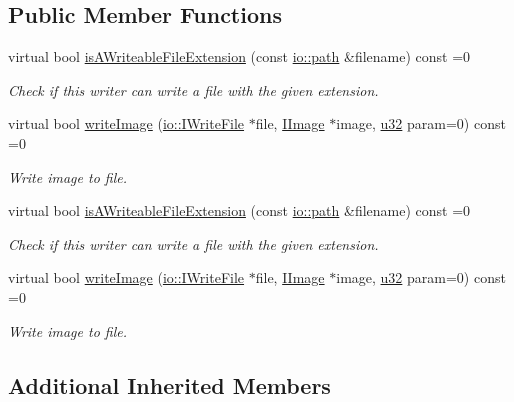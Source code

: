 \subsection*{Public Member Functions}
\begin{DoxyCompactItemize}
\item 
virtual bool \hyperlink{classirr_1_1video_1_1IImageWriter_a776f8a7a050572f2144848a86fe6de6b}{is\+A\+Writeable\+File\+Extension} (const \hyperlink{namespaceirr_1_1io_a6468281622ce3a1c46b72e19f32dded5}{io\+::path} \&filename) const =0
\begin{DoxyCompactList}\small\item\em Check if this writer can write a file with the given extension. \end{DoxyCompactList}\item 
virtual bool \hyperlink{classirr_1_1video_1_1IImageWriter_a0a7f09d1f1613adfe2bfaadc60913f7e}{write\+Image} (\hyperlink{classirr_1_1io_1_1IWriteFile}{io\+::\+I\+Write\+File} $\ast$file, \hyperlink{classirr_1_1video_1_1IImage}{I\+Image} $\ast$image, \hyperlink{namespaceirr_a0416a53257075833e7002efd0a18e804}{u32} param=0) const =0
\begin{DoxyCompactList}\small\item\em Write image to file. \end{DoxyCompactList}\item 
virtual bool \hyperlink{classirr_1_1video_1_1IImageWriter_a776f8a7a050572f2144848a86fe6de6b}{is\+A\+Writeable\+File\+Extension} (const \hyperlink{namespaceirr_1_1io_a6468281622ce3a1c46b72e19f32dded5}{io\+::path} \&filename) const =0
\begin{DoxyCompactList}\small\item\em Check if this writer can write a file with the given extension. \end{DoxyCompactList}\item 
virtual bool \hyperlink{classirr_1_1video_1_1IImageWriter_a0a7f09d1f1613adfe2bfaadc60913f7e}{write\+Image} (\hyperlink{classirr_1_1io_1_1IWriteFile}{io\+::\+I\+Write\+File} $\ast$file, \hyperlink{classirr_1_1video_1_1IImage}{I\+Image} $\ast$image, \hyperlink{namespaceirr_a0416a53257075833e7002efd0a18e804}{u32} param=0) const =0
\begin{DoxyCompactList}\small\item\em Write image to file. \end{DoxyCompactList}\end{DoxyCompactItemize}
\subsection*{Additional Inherited Members}


